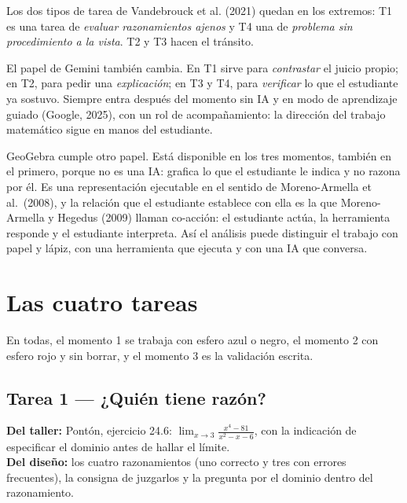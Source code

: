 \documentclass[11pt,letterpaper]{article}
\newenvironment{origen}{\par\small\noindent\ignorespaces}{\par\normalsize}
\begin{document}
Los dos tipos de tarea de Vandebrouck et al. (2021) quedan en los extremos: T1 es una tarea de \emph{evaluar razonamientos ajenos} y T4 una de \emph{problema sin procedimiento a la vista}. T2 y T3 hacen el tránsito.

El papel de Gemini también cambia. En T1 sirve para \emph{contrastar} el juicio propio; en T2, para pedir una \emph{explicación}; en T3 y T4, para \emph{verificar} lo que el estudiante ya sostuvo. Siempre entra después del momento sin IA y en modo de aprendizaje guiado (Google, 2025), con un rol de acompañamiento: la dirección del trabajo matemático sigue en manos del estudiante.

GeoGebra cumple otro papel. Está disponible en los tres momentos, también en el primero, porque no es una IA: grafica lo que el estudiante le indica y no razona por él. Es una representación ejecutable en el sentido de Moreno-Armella et al.\ (2008), y la relación que el estudiante establece con ella es la que Moreno-Armella y Hegedus (2009) llaman co-acción: el estudiante actúa, la herramienta responde y el estudiante interpreta. Así el análisis puede distinguir el trabajo con papel y lápiz, con una herramienta que ejecuta y con una IA que conversa.

\section{Las cuatro tareas}

En todas, el momento 1 se trabaja con esfero azul o negro, el momento 2 con esfero rojo y sin borrar, y el momento 3 es la validación escrita.

\subsection*{Tarea 1 --- ¿Quién tiene razón?}

\begin{origen}
\textbf{Del taller:} Pontón, ejercicio 24.6: $\lim_{x\to3}\frac{x^4-81}{x^2-x-6}$, con la indicación de especificar el dominio antes de hallar el límite.\\
\textbf{Del diseño:} los cuatro razonamientos (uno correcto y tres con errores frecuentes), la consigna de juzgarlos y la pregunta por el dominio dentro del razonamiento.
\end{origen}
\end{document}
